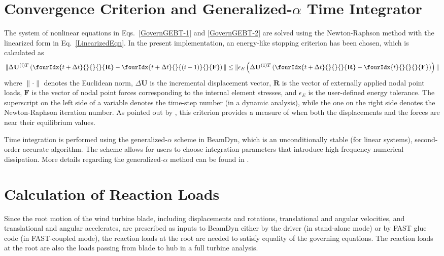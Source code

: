 \section{Convergence Criterion and Generalized-$\alpha$ Time Integrator}
\label{sec:ConvergenceCriterion}
The system of nonlinear equations in Eqs.~\eqref{GovernGEBT-1} and \eqref{GovernGEBT-2} are solved using the Newton-Raphson method with the linearized form in Eq.~\eqref{LinearizedEqn}. 
In the present implementation, an energy-like stopping criterion has been chosen, which is calculated as
\begin{equation}
    \label{StoppingCriterion}
    \| \Delta \mathbf{U}^{(i)T} \left( \fourIdx{t+\Delta t}{}{}{}{\mathbf{R}} -  \fourIdx{t+\Delta t}{}{(i-1)}{}{\mathbf{F}}  \right) \| \leq \| \epsilon_E \left( \Delta \mathbf{U}^{(1)T} \left( \fourIdx{t+\Delta t}{}{}{}{\mathbf{R}} - \fourIdx{t}{}{}{}{\mathbf{F}} \right) \right) \|
\end{equation}
where $\|\cdot\|$ denotes the Euclidean norm, $\Delta \mathbf{U}$ is the incremental displacement vector, $\mathbf{R}$ is the vector of externally applied nodal point loads, $\mathbf{F}$ is the vector of nodal point forces corresponding to the internal element stresses, and $\epsilon_E$ is the user-defined energy tolerance. 
The superscript on the left side of a variable denotes the time-step number (in a dynamic analysis), while the one on the right side denotes the Newton-Raphson iteration number. 
As pointed out by \cite{Bathe-Cimento:1980}, this criterion provides a measure of when both the displacements and the forces are near their equilibrium values. 

Time integration is performed using the generalized-$\alpha$ scheme in BeamDyn, which is an unconditionally stable (for linear systems), second-order accurate algorithm.  
The scheme allows for users to choose integration parameters that introduce high-frequency numerical dissipation. 
More details regarding the generalized-$\alpha$ method can be found in \cite{Chung-Hulbert:1993,Bauchau:2010}.  

\section{Calculation of Reaction Loads}
Since the root motion of the wind turbine blade, including displacements and rotations, translational and angular velocities, and translational and angular accelerates, are prescribed as inputs to BeamDyn either by the driver (in stand-alone mode) or by FAST glue code (in FAST-coupled mode), the reaction loads at the root are needed to satisfy equality of the governing equations. 
The reaction loads at the root are also the loads passing from blade to hub in a full turbine analysis. 


